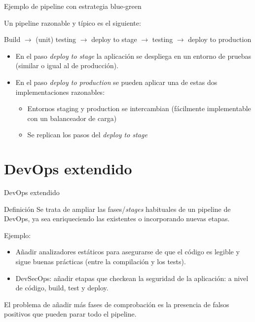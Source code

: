 \documentclass{beamer}
\begin{document}
\begin{frame}{Ejemplo de pipeline con estrategia blue-green}

Un pipeline razonable y típico es el siguiente:

\begin{center}
    Build $\rightarrow$ (unit) testing $\rightarrow$ deploy to stage $\rightarrow$ testing $\rightarrow$ deploy to production
\end{center}

\begin{itemize}
    \item En el paso \textit{deploy to stage} la aplicación se despliega en un entorno de pruebas (similar o igual al de producción).
    \item En el paso \textit{deploy to production} se pueden aplicar una de estas dos implementaciones razonables:
    \begin{itemize}
        \item Entornos staging y production se intercambian (fácilmente implementable con un balanceador de carga)
        \item Se replican los pasos del \textit{deploy to stage}
    \end{itemize}
\end{itemize}
\end{frame}

\section{DevOps extendido}

\begin{frame}{DevOps extendido}

\begin{block}{Definición}
Se trata de ampliar las fases/\textit{stages} habituales de un pipeline de DevOps, ya sea enriqueciendo las existentes o incorporando nuevas etapas.
\end{block}

Ejemplo:

\begin{itemize}
    \item Añadir analizadores estáticos para asegurarse de que el código es legible y sigue buenas prácticas (entre la compilación y los tests).
    \item DevSecOps: añadir etapas que checkean la seguridad de la aplicación: a nivel de código, build, test y deploy. %
\end{itemize}

El problema de añadir más fases de comprobación es la presencia de falsos positivos que pueden parar todo el pipeline.
    
\end{frame}
\end{document}
